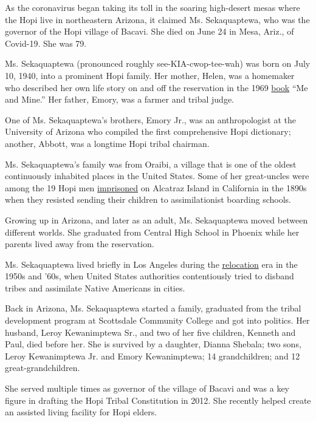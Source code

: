 As the coronavirus began taking its toll in the soaring high-desert
mesas where the Hopi live in northeastern Arizona, it claimed Ms.
Sekaquaptewa, who was the governor of the Hopi village of Bacavi. She
died on June 24 in Mesa, Ariz., of Covid-19. She was 79.

Ms. Sekaquaptewa (pronounced roughly see-KIA-cwop-tee-wah) was born on
July 10, 1940, into a prominent Hopi family. Her mother, Helen, was a
homemaker who described her own life story on and off the reservation in
the 1969 \href{https://uapress.arizona.edu/book/me-and-mine}{book} ``Me
and Mine.'' Her father, Emory, was a farmer and tribal judge.

One of Ms. Sekaquaptewa's brothers, Emory Jr., was an anthropologist at
the University of Arizona who compiled the first comprehensive Hopi
dictionary; another, Abbott, was a longtime Hopi tribal chairman.

Ms. Sekaquaptewa's family was from Oraibi, a village that is one of the
oldest continuously inhabited places in the United States. Some of her
great-uncles were among the 19 Hopi men
\href{https://calendar.eji.org/racial-injustice/jan/03}{imprisoned} on
Alcatraz Island in California in the 1890s when they resisted sending
their children to assimilationist boarding schools.

Growing up in Arizona, and later as an adult, Ms. Sekaquaptewa moved
between different worlds. She graduated from Central High School in
Phoenix while her parents lived away from the reservation.

Ms. Sekaquaptewa lived briefly in Los Angeles during the
\href{https://www.archives.gov/education/lessons/indian-relocation.html}{relocation}
era in the 1950s and '60s, when United States authorities contentiously
tried to disband tribes and assimilate Native Americans in cities.

Back in Arizona, Ms. Sekaquaptewa started a family, graduated from the
tribal development program at Scottsdale Community College and got into
politics. Her husband, Leroy Kewanimptewa Sr., and two of her five
children, Kenneth and Paul, died before her. She is survived by a
daughter, Dianna Shebala; two sons, Leroy Kewanimptewa Jr. and Emory
Kewanimptewa; 14 grandchildren; and 12 great-grandchildren.

She served multiple times as governor of the village of Bacavi and was a
key figure in drafting the Hopi Tribal Constitution in 2012. She
recently helped create an assisted living facility for Hopi elders.

